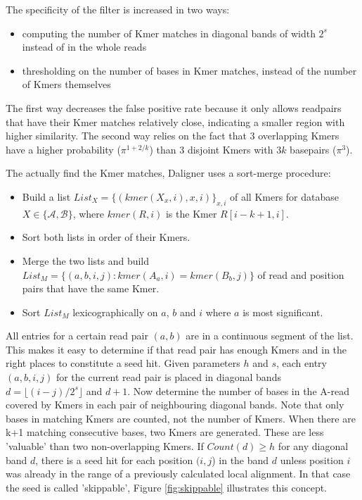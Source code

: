 \documentclass[../main/thesis.tex]{subfiles}
\begin{document}
The specificity of the filter is increased in two ways:
\begin{itemize}
\item computing the number of Kmer matches in diagonal bands of width $2^s$ instead of in the whole reads
\item thresholding on the number of bases in Kmer matches, instead of the number of Kmers themselves
\end{itemize}

The first way decreases the false positive rate because it only allows readpairs that have their Kmer matches relatively close, indicating a smaller region with higher similarity.
The second way relies on the fact that 3 overlapping Kmers have a higher probability ($\pi^{1+2/k}$) than 3 disjoint Kmers with $3k$ basepairs ($\pi^3$).


The actually find the Kmer matches, Daligner uses a sort-merge procedure:
\begin{itemize}
\item Build a list $List_X = \{(kmer(X_x,i),x,i)\}_{x,i}$ of all Kmers for database $X \in \{\mathcal{A},\mathcal{B}\}$, where $kmer(R,i)$ is the Kmer $R[i-k+1,i]$.
\item Sort both lists in order of their Kmers.
\item Merge the two lists and build $List_M=\{(a,b,i,j): kmer(A_a,i) = kmer(B_b,j)\}$ of read and position pairs that have the same Kmer.
\item Sort $List_M$ lexicographically on $a$, $b$ and $i$ where $a$ is most significant.
\end{itemize}

All entries for a certain read pair $(a,b)$ are in a continuous segment of the list.
This makes it easy to determine if that read pair has enough Kmers and in the right places to constitute a seed hit.
Given parameters $h$ and $s$, each entry $(a,b,i,j)$ for the current read pair is placed in diagonal bands $d = \lfloor(i-j)/2^s\rfloor$ and $d+1$.
Now determine the number of bases in the A-read covered by Kmers in each pair of neighbouring diagonal bands.
Note that only bases in matching Kmers are counted, not the number of Kmers.
When there are k+1 matching consecutive bases, two Kmers are generated.
These are less 'valuable' than two non-overlapping Kmers.
If $Count(d) \ge h$ for any diagonal band $d$, there is a seed hit for each position $(i,j$) in the band $d$ unless position $i$ was already in the range of a previously calculated local alignment.
In that case the seed is called 'skippable', Figure \ref{fig:skippable} illustrates this concept.
\end{document}
